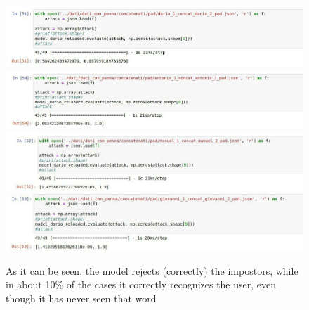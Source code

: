 \documentclass[8pt,notitlepage]{report}
\begin{document}
	\begin{figure}[H]
		\begin{center}
			\includegraphics[scale=.3]{scrittura_dario}
			\includegraphics[scale=.3]{scrittura_antonio}
			\includegraphics[scale=.3]{scrittura_manuel}
			\includegraphics[scale=.3]{scrittura_giovanni}
			\caption{As it can be seen, the model rejects (correctly) the impostors, while in about 10\% of the cases it correctly recognizes the user, even though it has never seen that word}
			\label{fig:ciao}
		\end{center}
	\end{figure}




{}
\end{document}
